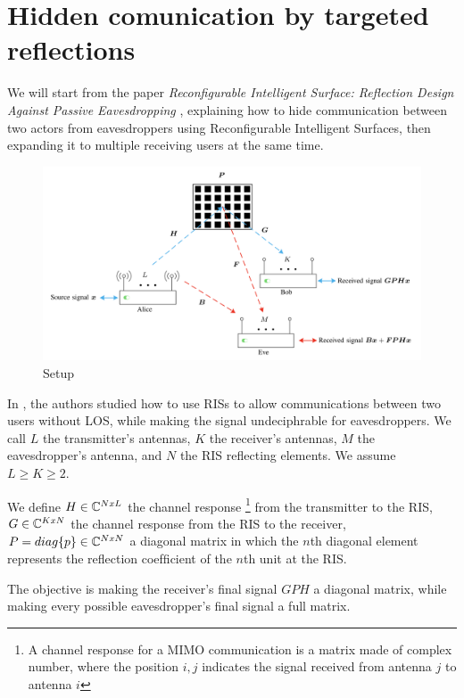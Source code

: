 \section{Hidden comunication by targeted reflections}

We will start from the paper \textit{Reconfigurable Intelligent Surface: Reflection Design Against Passive Eavesdropping} \cite{9328149}, explaining how to hide communication between two actors from eavesdroppers using Reconfigurable Intelligent Surfaces, then expanding it to multiple receiving users at the same time.

\begin{figure}[H]
  \centering
  \includegraphics[width=\linewidth]{imgs/problem-description.png}
  \caption{Setup}
  \label{fig:correlation_sk}
\end{figure}

In \cite{9328149}, the authors studied how to use RISs to allow communications between two users without LOS, while making the signal undeciphrable for eavesdroppers. We call $L$ the transmitter's antennas, $K$ the receiver's antennas, $M$ the eavesdropper's antenna, and $N$ the RIS reflecting elements. We assume $L \ge K \ge 2$.

We define $H \in \mathbb{C}^{NxL}$ the channel response \footnote{A channel response for a MIMO communication is a matrix made of complex number, where the position $i,j$ indicates the signal received from antenna $j$ to antenna $i$} from the transmitter to the RIS, $G \in \mathbb{C}^{KxN}$ the channel response from the RIS to the receiver, $P = diag\{p\} \in \mathbb{C}^{NxN}$ a diagonal matrix in which the $n$th diagonal element represents the reﬂection coefﬁcient of the $n$th unit at the RIS.

The objective is making the receiver's final signal $GPH$ a diagonal matrix, while making every possible eavesdropper's final signal a full matrix.

